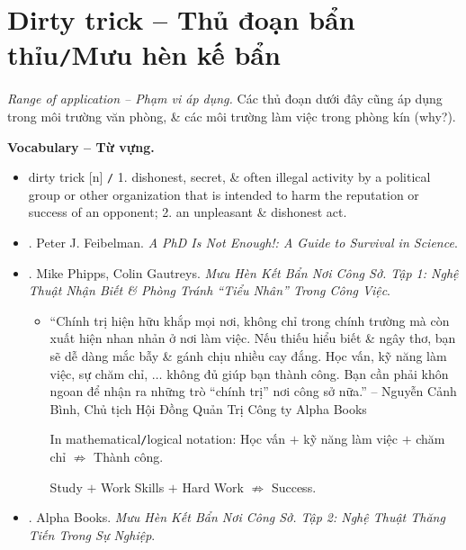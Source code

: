 \documentclass[12pt,twoside]{book}
\begin{document}
\section{Dirty trick -- Thủ đoạn bẩn thỉu{\tt/}Mưu hèn kế bẩn}
\label{subsect: dirty tricks}
{\it Range of application -- Phạm vi áp dụng.} Các thủ đoạn dưới đây cũng áp dụng trong môi trường văn phòng, \& các môi trường làm việc trong phòng kín (why?).

\noindent\textbf{\textsf{\small Vocabulary -- Từ vựng.}}
\begin{itemize}\small
	\item {\sf dirty trick} [n] {\tt/} 1. dishonest, secret, \& often illegal activity by a political group or other organization that is intended to harm the reputation or success of an opponent; 2. an unpleasant \& dishonest act.
\end{itemize}

\begin{itemize}
	\item \cite{Feibelman2011}. {\sc Peter J. Feibelman}. {\it A PhD Is Not Enough!: A Guide to Survival in Science}.
	\item \cite{Phipps_Gautreys_muu_hen_ke_ban_tap_1}. {\sc Mike Phipps, Colin Gautreys}. {\it Mưu Hèn Kết Bẩn Nơi Công Sở. Tập 1: Nghệ Thuật Nhận Biết \& Phòng Tránh ``Tiểu Nhân'' Trong Công Việc}.
	\begin{itemize}
		\item ``Chính trị hiện hữu khắp mọi nơi, không chỉ trong chính trường mà còn xuất hiện nhan nhản ở nơi làm việc. Nếu thiếu hiểu biết \& ngây thơ, bạn sẽ dễ dàng mắc bẫy \& gánh chịu nhiều cay đắng. Học vấn, kỹ năng làm việc, sự chăm chỉ, $\ldots$ không đủ giúp bạn thành công. Bạn cần phải khôn ngoan để nhận ra những trò ``chính trị'' nơi công sở nữa.'' -- {\sc Nguyễn Cảnh Bình}, Chủ tịch Hội Đồng Quản Trị Công ty Alpha Books
		
		{\sf In mathematical{\tt/}logical notation}: Học vấn $+$ kỹ năng làm việc $+$ chăm chỉ $\not\Rightarrow$ Thành công.
		\begin{center}
			Study $+$ Work Skills $+$ Hard Work $\not\Rightarrow$ Success.
		\end{center}
		
	\end{itemize}
	\item \cite{muu_hen_ke_ban_tap_2}. Alpha Books. {\it Mưu Hèn Kết Bẩn Nơi Công Sở. Tập 2: Nghệ Thuật Thăng Tiến Trong Sự Nghiệp}.
\end{itemize}
\end{document}
